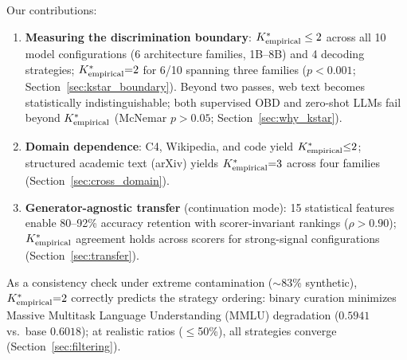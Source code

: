 Our contributions:
\begin{enumerate}[label=(\alph*),nosep]
  \item \textbf{Measuring the discrimination boundary}: ${K^*_{\text{empirical}}} \leq 2$ across all 10 model configurations (6 architecture families, 1B--8B) and 4 decoding strategies; ${K^*_{\text{empirical}}}{=}2$ for 6/10 spanning three families ($p < 0.001$; Section~\ref{sec:kstar_boundary}).
  Beyond two passes, web text becomes statistically indistinguishable; both supervised OBD and zero-shot LLMs fail beyond ${K^*_{\text{empirical}}}$ (McNemar $p > 0.05$; Section~\ref{sec:why_kstar}).
  \item \textbf{Domain dependence}: C4, Wikipedia, and code yield ${K^*_{\text{empirical}}}{\leq}2$; structured academic text (arXiv) yields ${K^*_{\text{empirical}}}{=}3$ across four families (Section~\ref{sec:cross_domain}).
  \item \textbf{Generator-agnostic transfer} (continuation mode): 15 statistical features enable 80--92\% accuracy retention with scorer-invariant rankings ($\rho > 0.90$); ${K^*_{\text{empirical}}}$ agreement holds across scorers for strong-signal configurations (Section~\ref{sec:transfer}).
\end{enumerate}

\noindent As a consistency check under extreme contamination (${\sim}$83\% synthetic), ${K^*_{\text{empirical}}}{=}2$ correctly predicts the strategy ordering: binary curation minimizes Massive Multitask Language Understanding (MMLU) degradation ($0.5941$ vs.\ base $0.6018$); at realistic ratios ($\leq$50\%), all strategies converge (Section~\ref{sec:filtering}).
